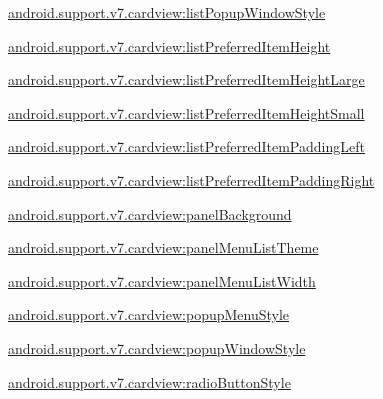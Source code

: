 {\ttfamily \hyperlink{classandroid_1_1support_1_1v7_1_1cardview_1_1R_1_1styleable_a8c1f6899fdf824c15d7b6e5fb01901a3}{android.\+support.\+v7.\+cardview\+:list\+Popup\+Window\+Style}}

{\ttfamily \hyperlink{classandroid_1_1support_1_1v7_1_1cardview_1_1R_1_1styleable_a619c201403d7a5bd57d8bba7b672369e}{android.\+support.\+v7.\+cardview\+:list\+Preferred\+Item\+Height}}

{\ttfamily \hyperlink{classandroid_1_1support_1_1v7_1_1cardview_1_1R_1_1styleable_a54f8f73307e3dad436997279e7e73d17}{android.\+support.\+v7.\+cardview\+:list\+Preferred\+Item\+Height\+Large}}

{\ttfamily \hyperlink{classandroid_1_1support_1_1v7_1_1cardview_1_1R_1_1styleable_a2edb3e97a83d754327dc42bd719ef9d4}{android.\+support.\+v7.\+cardview\+:list\+Preferred\+Item\+Height\+Small}}

{\ttfamily \hyperlink{classandroid_1_1support_1_1v7_1_1cardview_1_1R_1_1styleable_ae88ee6cfa6fa7463687b22b65c5090eb}{android.\+support.\+v7.\+cardview\+:list\+Preferred\+Item\+Padding\+Left}}

{\ttfamily \hyperlink{classandroid_1_1support_1_1v7_1_1cardview_1_1R_1_1styleable_a12084f5e81db166fdb702be49115eaf3}{android.\+support.\+v7.\+cardview\+:list\+Preferred\+Item\+Padding\+Right}}

{\ttfamily \hyperlink{classandroid_1_1support_1_1v7_1_1cardview_1_1R_1_1styleable_a094e72d54827cbb597f966b9f78f4ef2}{android.\+support.\+v7.\+cardview\+:panel\+Background}}

{\ttfamily \hyperlink{classandroid_1_1support_1_1v7_1_1cardview_1_1R_1_1styleable_a11a1d1569aae164daa489fb3f50bd2b6}{android.\+support.\+v7.\+cardview\+:panel\+Menu\+List\+Theme}}

{\ttfamily \hyperlink{classandroid_1_1support_1_1v7_1_1cardview_1_1R_1_1styleable_a2f64ef2552f266f4bb03dd99b70b4aa3}{android.\+support.\+v7.\+cardview\+:panel\+Menu\+List\+Width}}

{\ttfamily \hyperlink{classandroid_1_1support_1_1v7_1_1cardview_1_1R_1_1styleable_a1661ed867614a2bbfea7605ed5b8da7b}{android.\+support.\+v7.\+cardview\+:popup\+Menu\+Style}}

{\ttfamily \hyperlink{classandroid_1_1support_1_1v7_1_1cardview_1_1R_1_1styleable_a6bbd99358284cc2f4f173afb1fe1bd7c}{android.\+support.\+v7.\+cardview\+:popup\+Window\+Style}}

{\ttfamily \hyperlink{classandroid_1_1support_1_1v7_1_1cardview_1_1R_1_1styleable_a7ff022a059deabbb175cc243b5ea6c68}{android.\+support.\+v7.\+cardview\+:radio\+Button\+Style}}

